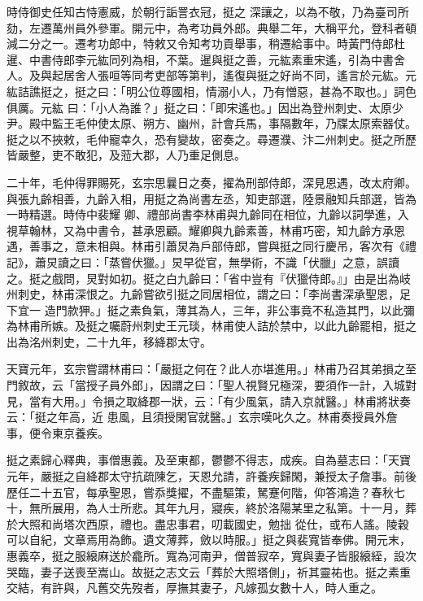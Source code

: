 \begin{pinyinscope}
 時侍御史任知古恃憲威，於朝行詬詈衣冠，挺之
 深讓之，以為不敬，乃為臺司所劾，左遷萬州員外參軍。開元中，為考功員外郎。典舉二年，大稱平允，登科者頓減二分之一。遷考功郎中，特敕又令知考功貢舉事，稍遷給事中。時黃門侍郎杜暹、中書侍郎李元紘同列為相，不葉。暹與挺之善，元紘素重宋遙，引為中書舍人。及與起居舍人張咺等同考吏部等第判，遙復與挺之好尚不同，遙言於元紘。元紘詰譙挺之，挺之曰：「明公位尊國相，情溺小人，乃有憎惡，甚為不取也。」詞色俱厲。元紘
 曰：「小人為誰？」挺之曰：「即宋遙也。」因出為登州刺史、太原少尹。殿中監王毛仲使太原、朔方、幽州，計會兵馬，事隔數年，乃牒太原索器仗。挺之以不挾敕，毛仲寵幸久，恐有變故，密奏之。尋遷濮、汴二州刺史。挺之所歷皆嚴整，吏不敢犯，及蒞大郡，人乃重足側息。



 二十年，毛仲得罪賜死，玄宗思曩日之奏，擢為刑部侍郎，深見恩遇，改太府卿。與張九齡相善，九齡入相，用挺之為尚書左丞，知吏部選，陸景融知兵部選，皆為一時精選。時侍中裴耀
 卿、禮部尚書李林甫與九齡同在相位，九齡以詞學進，入視草翰林，又為中書令，甚承恩顧。耀卿與九齡素善，林甫巧密，知九齡方承恩遇，善事之，意未相與。林甫引蕭炅為戶部侍郎，嘗與挺之同行慶吊，客次有《禮記》，蕭炅讀之曰：「蒸嘗伏獵。」炅早從官，無學術，不識「伏臘」之意，誤讀之。挺之戲問，炅對如初。挺之白九齡曰：「省中豈有『伏獵侍郎。』」由是出為岐州刺史，林甫深恨之。九齡嘗欲引挺之同居相位，謂之曰：「李尚書深承聖恩，足下宜一
 造門款狎。」挺之素負氣，薄其為人，三年，非公事竟不私造其門，以此彌為林甫所嫉。及挺之囑蔚州刺史王元琰，林甫使人詰於禁中，以此九齡罷相，挺之出為洺州刺史，二十九年，移絳郡太守。



 天寶元年，玄宗嘗謂林甫曰：「嚴挺之何在？此人亦堪進用。」林甫乃召其弟損之至門敘故，云「當授子員外郎」，因謂之曰：「聖人視賢兄極深，要須作一計，入城對見，當有大用。」令損之取絳郡一狀，云：「有少風氣，請入京就醫。」林甫將狀奏云：「挺之年高，近
 患風，且須授閑官就醫。」玄宗嘆叱久之。林甫奏授員外詹事，便令東京養疾。



 挺之素歸心釋典，事僧惠義。及至東都，鬱鬱不得志，成疾。自為墓志曰：「天寶元年，嚴挺之自絳郡太守抗疏陳乞，天恩允請，許養疾歸閑，兼授太子詹事。前後歷任二十五官，每承聖恩，嘗忝獎擢，不盡驅策，駑蹇何階，仰答鴻造？春秋七十，無所展用，為人士所悲。其年九月，寢疾，終於洛陽某里之私第。十一月，葬於大照和尚塔次西原，禮也。盡忠事君，叨載國史，勉拙
 從仕，或布人謠。陵穀可以自紀，文章焉用為飾。遺文薄葬，斂以時服。」挺之與裴寬皆奉佛。開元末，惠義卒，挺之服縗麻送於龕所。寬為河南尹，僧普寂卒，寬與妻子皆服縗絰，設次哭臨，妻子送喪至嵩山。故挺之志文云「葬於大照塔側」，祈其靈祐也。挺之素重交結，有許與，凡舊交先歿者，厚撫其妻子，凡嫁孤女數十人，時人重之。




\end{pinyinscope}
